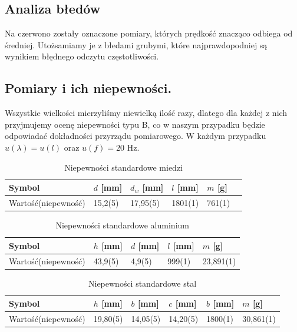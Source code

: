 \documentclass [a4paper,11pt]{article}
\begin{document}
	\subsection{Analiza błedów}
	Na czerwono zostały oznaczone pomiary, których prędkość znacząco odbiega od średniej. Utożsamiamy je z błedami grubymi, które najprawdopodniej są wynikiem błędnego odczytu częstotliwości. 

	\subsection{Pomiary i ich niepewności.}
		
		Wszystkie wielkości mierzyliśmy niewielką ilość razy, dlatego dla każdej z nich przyjmujemy ocenę niepewności typu B, co w naszym przypadku będzie odpowiadać dokładności przyrządu pomiarowego.\newline
		W każdym przypadku $u(\lambda) = u(l) $ oraz $u(f) = 20 \text{ Hz}$.
		\begin{table}[h!]
			\centering
			\caption{Niepewności standardowe miedzi}
			\label{tab:nsmiedz}
			\begin{tabular}{l|l|l|l|l|l}
				 Symbol & \textit{$d$} [mm]  & \textit{$d_w$} [mm]   & \textit{$l$} [mm]     &  \textit{$m$} [g]  \\ \hline
				 Wartość(niepewność) & 15,2(5)      & 17,95(5) & 1801(1) & 761(1) \\
			\end{tabular}
		\end{table}
	
		\begin{table}[h!]
			\centering
			\caption{Niepewności standardowe aluminium}
			\label{tab:nsaluminium}
			\begin{tabular}{l|l|l|l|l}
				Symbol & \textit{$h$} [mm]  & \textit{$d$} [mm]   & \textit{$l$} [mm]     &  \textit{$m$} [g]   \\ \hline
				Wartość(niepewność) & 43,9(5)      & 4,9(5) & 999(1) & 23,891(1) \\
			\end{tabular}
		\end{table}
		
		\begin{table}[h!]
			\centering
			\caption{Niepewności standardowe stal}
			\label{tab:nsstal}
			\begin{tabular}{l|l|l|l|l|l}
				Symbol & \textit{$h$} [mm]  & \textit{$b$} [mm]   & \textit{$c$} [mm]  & \textit{$b$} [mm]      & \textit{$m$} [g]   \\ \hline
				Wartość(niepewność) &19,80(5) & 14,05(5)      & 14,20(5) & 1800(1) & 30,861(1) \\
			\end{tabular}
		\end{table}
	
\end{document}
